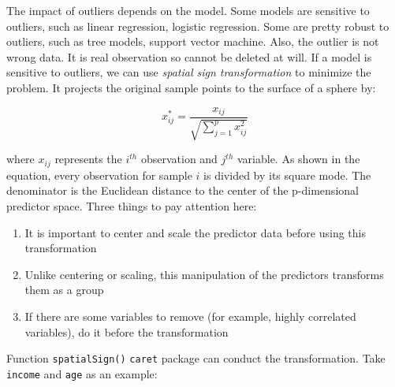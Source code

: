 \documentclass[12pt,]{krantz}
\providecommand{\tightlist}{%
  \setlength{\itemsep}{0pt}\setlength{\parskip}{0pt}}
\begin{document}
The impact of outliers depends on the model. Some models are sensitive to outliers, such as linear regression, logistic regression. Some are pretty robust to outliers, such as tree models, support vector machine. Also, the outlier is not wrong data. It is real observation so cannot be deleted at will. If a model is sensitive to outliers, we can use \emph{spatial sign transformation} \citep{ssp} to minimize the problem. It projects the original sample points to the surface of a sphere by:

\[x_{ij}^{*}=\frac{x_{ij}}{\sqrt{\sum_{j=1}^{p}x_{ij}^{2}}}\]

where \(x_{ij}\) represents the \(i^{th}\) observation and \(j^{th}\) variable. As shown in the equation, every observation for sample \(i\) is divided by its square mode. The denominator is the Euclidean distance to the center of the p-dimensional predictor space. Three things to pay attention here:

\begin{enumerate}
\def\labelenumi{\arabic{enumi}.}
\tightlist
\item
  It is important to center and scale the predictor data before using this transformation
\item
  Unlike centering or scaling, this manipulation of the predictors transforms them as a group
\item
  If there are some variables to remove (for example, highly correlated variables), do it before the transformation
\end{enumerate}

Function \texttt{spatialSign()} \texttt{caret} package can conduct the transformation. Take \texttt{income} and \texttt{age} as an example:
\end{document}
